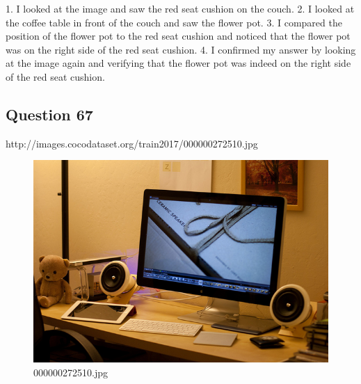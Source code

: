 \begin{enumerate}
    1. I looked at the image and saw the red seat cushion on the couch.
    2. I looked at the coffee table in front of the couch and saw the flower pot.
    3. I compared the position of the flower pot to the red seat cushion and noticed that the flower pot was on the right side of the red seat cushion.
    4. I confirmed my answer by looking at the image again and verifying that the flower pot was indeed on the right side of the red seat cushion.
\end{enumerate}
\subsection*{Question 67}
http://images.cocodataset.org/train2017/000000272510.jpg
\begin{figure}[h]
    \centering
    \includegraphics[width=0.8\linewidth]{../image set/hard/000000272510.jpg}
    \caption{000000272510.jpg}
\end{figure}
